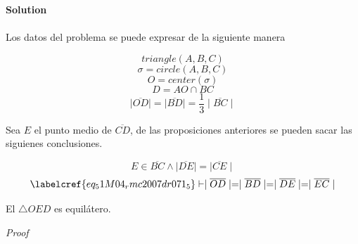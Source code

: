 \noindent\textbf{Solution } \\\\
Los datos del problema se puede expresar de la siguiente manera 

\begin{equation} \label{eq_51M04_rmc2007dr071_0}
	triangle(A, B, C)
\end{equation}
\begin{equation} \label{eq_51M04_rmc2007dr071_1}
	\sigma = circle(A, B, C)
\end{equation}
\begin{equation} \label{eq_51M04_rmc2007dr071_2}
	O = center(\sigma)
\end{equation}
\begin{equation} \label{eq_51M04_rmc2007dr071_4}
	D = AO \cap BC
\end{equation}
\begin{equation} \label{eq_51M04_rmc2007dr071_5}
	\mid \overline{OD} \mid = \mid \overline{BD} \mid = \frac{1}{3} \mid \overline{BC} \mid
\end{equation}

Sea $E$ el punto medio de $\overline{CD}$, de las proposiciones anteriores se pueden sacar las siguienes conclusiones.

\begin{equation} \label{eq_51M04_rmc2007dr071_7}
	E \in \overline{BC} \land \mid\overline{DE}\mid = \mid\overline{CE}\mid
\end{equation}
\begin{equation} \label{eq_51M04_rmc2007dr071_8}
	\labelcref{eq_51M04_rmc2007dr071_5} \vdash \mid \overline{OD} \mid = \mid \overline{BD} \mid = \mid \overline{DE} \mid = \mid \overline{EC} \mid
\end{equation}

\begin{claim}
	El $\triangle{OED}$ es equilátero.
\end{claim}
\textit{Proof}

